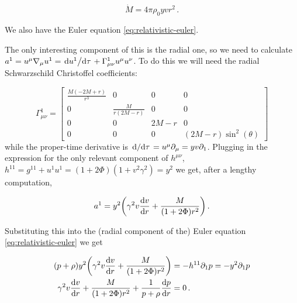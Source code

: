 \documentclass[main.tex]{subfiles}
\begin{document}
\begin{equation} \label{eq:mass-conservation-integral}
  \dot{M} = 4 \pi\rho_0 yvr^2 \,.
\end{equation}

We also have the Euler equation \eqref{eq:relativistic-euler}.

The only interesting component of this is the radial one, so we need to calculate \(a^1 = u^\mu \nabla_\mu u^1 = \dv*{u^1}{\tau} + \Gamma^1_{\mu \nu} u^\mu u^\nu \). To do this we will need the radial Schwarzschild Christoffel coefficients:

\begin{equation}
  \Gamma^1_{\mu \nu} = \left[\begin{matrix}\frac{M \left(- 2 M + r\right)}{r^{3}} & 0 & 0 & 0\\0 & \frac{M}{r \left(2 M - r\right)} & 0 & 0\\0 & 0 & 2 M - r & 0\\0 & 0 & 0 & \left(2 M - r\right) \sin^{2}{\left(\theta \right)}\end{matrix}\right]
\end{equation}
while the proper-time derivative is \(\dv*{}{\tau} = u^\mu \partial_\mu = yv\partial_1\).
Plugging in the expression for the only relevant component of \(h^{\mu\nu}\), \(h^{11} = g^{11} + u^1 u^1 = (1 + 2 \Phi) (1 + v^2 \gamma^2) = y^2\)
we get, after a lengthy computation,

\begin{equation}
  a^1 = y^2 \qty(\gamma^2 v \dv{v}{r} + \frac{M}{(1+ 2 \Phi) r^2}) \,.
\end{equation}

Substituting this into the (radial component of the) Euler equation \eqref{eq:relativistic-euler} we get

\begin{subequations}
\begin{align}
  (p + \rho) y^2 \qty(\gamma^2 v \dv{v}{r} + \frac{M}{(1+ 2 \Phi) r^2}) &= - h^{1 1} \partial_1 p = - y^2 \partial_1 p \\
   \gamma^2 v \dv{v}{r} + \frac{M}{(1+ 2 \Phi) r^2} + \frac{1}{p + \rho} \dv{p}{r} &= 0 \,.
  \label{eq:ideal-euler}
\end{align}
\end{subequations}

\end{document}
